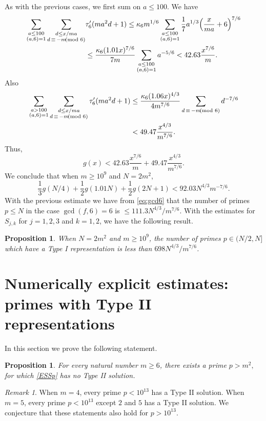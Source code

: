 \documentclass[12pt]{amsart}
\newtheorem{prop}[theorem]{Proposition}
\theoremstyle{definition}
\theoremstyle{remark}
\newtheorem{remark}[theorem]{Remark}
\numberwithin{equation}{section}
\begin{document}
As with the previous cases, we first sum on $a\le100$.  We have
\begin{align*}
\sum_{\substack{a\le100\\(a,6)=1}}\sum_{\substack{d\le x/ma\\d\,\equiv\,-m\kern-5pt\pmod6}}&\tau'_6(ma^2d+1)
\le\kappa_6m^{1/6}\sum_{\substack{a\le100\\(a,6)=1}}\frac17a^{1/3}\Big(\frac{x}{ma}+6\Big)^{7/6}\\
&\le\frac{\kappa_6(1.01x)^{7/6}}{7m}\sum_{\substack{a\le100\\(a,6)=1}}a^{-5/6}
<42.63\frac{x^{7/6}}m.
\end{align*}
Also
\begin{align*}
\sum_{\substack{a>100\\(a,6)=1}}\sum_{\substack{d\le x/ma\\d\,\equiv\,-m\kern-5pt\pmod6}}\tau'_6(ma^2d+1)
&\le \frac{\kappa_6(1.06x)^{4/3}}{4m^{7/6}}\sum_{d\,\equiv\,-m\kern-5pt\pmod6}d^{-7/6}\\
&<49.47\frac{x^{4/3}}{m^{7/6}}.
\end{align*}
Thus, 
\[
g(x)<42.63\frac{x^{7/6}}{m}+49.47\frac{x^{4/3}}{m^{7/6}}.
\]
We conclude that when $m\ge 10^9$ and $N=2m^2$,
\[
\frac13g(N/4)+\frac12g(1.01N)+\frac12g(2N+1)<92.03N^{4/3}m^{-7/6}.
\]
With the previous estimate we have from \eqref{eq:gcd6} that the number of primes $p\le N$ in the case
$\gcd(f,6)=6$ is $\le111.3N^{4/3}/m^{7/6}$.  With the estimates for $S_{j,k}$ for $j=1,2,3$ and $k=1,2$, we have the following result.

\begin{prop}
\label{typeIcount}
When $N=2m^2$ and $m\ge10^9$, the 
number of primes $p\in(N/2, N]$ which have a Type I representation is less than $698N^{4/3}/m^{7/6}$.
\end{prop}

\section{Numerically explicit estimates: primes with Type II representations}
\label{secII}
In this section we  prove the following statement.

\begin{prop}
\label{prop-explicit}
For every natural number $m\ge 6$, there exists a prime 
$
p>m^2,
$
for which \eqref{ESSp} has no Type II solution.
\end{prop}

\begin{remark}
When $m=4$, every prime $p < 10^{13}$ has a Type II solution.
When $m=5$,  every prime $p < 10^{13}$ except $2$ and $5$ has a Type II solution.
We conjecture that these statements also hold for $p>10^{13}$.
\end{remark}
\end{document}

